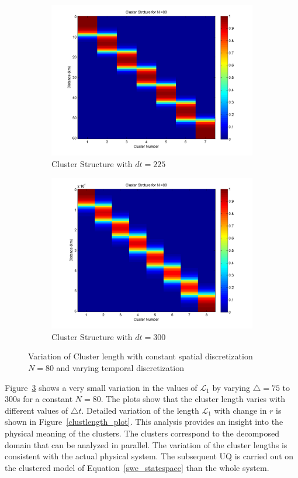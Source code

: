 \begin{figure}[H]
\begin{subfigure}[b]{0.4\textwidth}
\centering
\includegraphics[width=\textwidth]{figures_2/fig_cluster_162_60_225}
\caption{Cluster Structure with $dt = 225$}
\label{clust_dt_225}
\end{subfigure}   
\begin{subfigure}[b]{0.4\textwidth}
\centering
\includegraphics[width=\textwidth]{figures_2/fig_cluster_162_60_300}
\caption{Cluster Structure with $dt = 300$}
\label{clust_dt_300}
\end{subfigure}
\caption{Variation of Cluster length with constant spatial discretization $N = 80$ and varying temporal discretization}
\label{clustlength_2}
\end{figure}

Figure~\ref{clustlength_2} shows a very small variation in the values of $\mathcal{L}_1$ by varying $\bigtriangleup =  75$ to $300$s  for a constant $N = 80$. The plots show that the cluster length varies with different values of $\bigtriangleup t$. Detailed variation of the length $\mathcal{L}_1$ with change in $r$ is shown in Figure~\ref{clustlength_plot}. This analysis provides an insight into the physical meaning of the clusters. The clusters correspond to the decomposed domain that can be analyzed in parallel. The variation of the cluster lengths is consistent with the actual physical system. The subsequent UQ is carried out on the clustered model of Equation~\ref{swe_statespace} than the whole system. 

